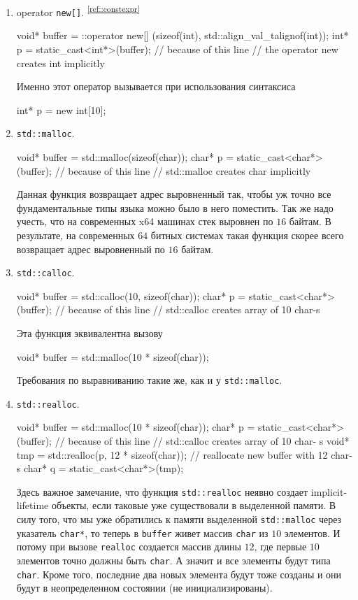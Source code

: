 \documentclass{article}
\begin{document}
\begin{enumerate}
\begin{enumerate}
\item operator \verb"new[]".%
\textsuperscript{\ref{ref::constexpr}}
\begin{cppcode}[numbers = none]
void* buffer = ::operator new[] (sizeof(int), std::align_val_t{alignof(int)});
int* p = static_cast<int*>(buffer); // because of this line
                                    // the operator new creates int implicitly
\end{cppcode}
Именно этот оператор вызывается при использования синтаксиса
\begin{cppcode}[numbers = none]
int* p = new int[10];
\end{cppcode}

\item \verb"std::malloc".
\begin{cppcode}[numbers = none]
void* buffer = std::malloc(sizeof(char));
char* p = static_cast<char*>(buffer); // because of this line
                                      // std::malloc creates char implicitly
\end{cppcode}
Данная функция возвращает адрес выровненный так, чтобы уж точно все фундаментальные типы языка можно было в него поместить.
Так же надо учесть, что на современных x64 машинах стек выровнен по $16$ байтам.
В результате, на современных $64$ битных системах такая функция скорее всего возвращает адрес выровненный по $16$ байтам.

\item \verb"std::calloc".
\begin{cppcode}[numbers = none]
void* buffer = std::calloc(10, sizeof(char));
char* p = static_cast<char*>(buffer); // because of this line
                                      // std::calloc creates array of 10 char-s
\end{cppcode}
Эта функция эквивалентна вызову
\begin{cppcode}[numbers = none]
void* buffer = std::malloc(10 * sizeof(char));
\end{cppcode}
Требования по выравниванию такие же, как и у \verb"std::malloc".

\item \verb"std::realloc".
\begin{cppcode}[numbers = none]
void* buffer = std::malloc(10 * sizeof(char));
char* p = static_cast<char*>(buffer); // because of this line
                                      // std::calloc creates array of 10 char-
s
void* tmp = std::realloc(p, 12 * sizeof(char)); // reallocate new buffer with 12 char-s
char* q = static_cast<char*>(tmp);
\end{cppcode}
Здесь важное замечание, что функция \verb"std::realloc" неявно создает implicit-lifetime объекты, если таковые уже существовали в выделенной памяти.
В силу того, что мы уже обратились к памяти выделенной \verb"std::malloc" через указатель \verb"char*", то теперь в \verb"buffer" живет массив \verb"char" из $10$ элементов.
И потому при вызове \verb"realloc" создается массив длины $12$, где первые $10$ элементов точно должны быть \verb"char".
А значит и все элементы будут типа \verb"char".
Кроме того, последние два новых элемента будут тоже созданы и они будут в неопределенном состоянии (не инициализированы).


\end{enumerate}
\end{enumerate}
\end{document}
